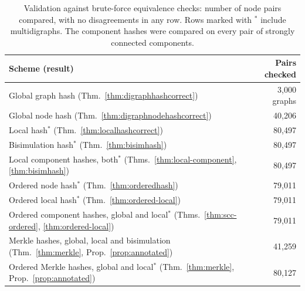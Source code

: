 \documentclass[twoside,leqno]{article}
\begin{document}
\begin{table}[t]
\centering
\caption{Validation against brute-force equivalence checks: number of node pairs compared, with no disagreements in any row. Rows marked with $^*$ include multidigraphs. The component hashes were compared on every pair of strongly connected components.}
\label{tab:validation}
\begin{tabular}{@{}lr@{}}
\toprule
Scheme (result) & Pairs checked \\
\midrule
Global graph hash (Thm.~\ref{thm:digraphhashcorrect}) & 3{,}000 graphs \\
Global node hash (Thm.~\ref{thm:digraphnodehashcorrect}) & 40{,}206 \\
Local hash$^*$ (Thm.~\ref{thm:localhashcorrect}) & 80{,}497 \\
Bisimulation hash$^*$ (Thm.~\ref{thm:bisimhash}) & 80{,}497 \\
Local component hashes, both$^*$ (Thms.~\ref{thm:local-component}, \ref{thm:bisimhash}) & 80{,}497 \\
Ordered node hash$^*$ (Thm.~\ref{thm:orderedhash}) & 79{,}011 \\
Ordered local hash$^*$ (Thm.~\ref{thm:ordered-local}) & 79{,}011 \\
Ordered component hashes, global and local$^*$ (Thms.~\ref{thm:scc-ordered}, \ref{thm:ordered-local}) & 79{,}011 \\
Merkle hashes, global, local and bisimulation (Thm.~\ref{thm:merkle}, Prop.~\ref{prop:annotated}) & 41{,}259 \\
Ordered Merkle hashes, global and local$^*$ (Thm.~\ref{thm:merkle}, Prop.~\ref{prop:annotated}) & 80{,}127 \\
\bottomrule
\end{tabular}
\end{table}
\end{document}
